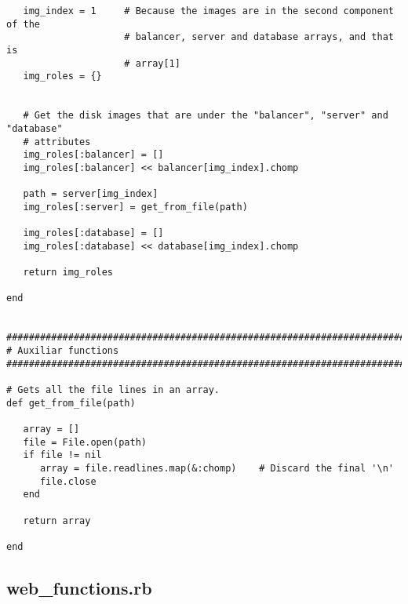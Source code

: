 \begin{lstlisting}
   img_index = 1     # Because the images are in the second component of the
                     # balancer, server and database arrays, and that is
                     # array[1]
   img_roles = {}

   
   # Get the disk images that are under the "balancer", "server" and "database"
   # attributes
   img_roles[:balancer] = []
   img_roles[:balancer] << balancer[img_index].chomp
   
   path = server[img_index]
   img_roles[:server] = get_from_file(path)
   
   img_roles[:database] = []
   img_roles[:database] << database[img_index].chomp
   
   return img_roles
   
end


################################################################################
# Auxiliar functions
################################################################################

# Gets all the file lines in an array.
def get_from_file(path)

   array = []
   file = File.open(path)
   if file != nil
      array = file.readlines.map(&:chomp)    # Discard the final '\n'
      file.close
   end

   return array

end
\end{lstlisting}


\subsection{web\_functions.rb}


